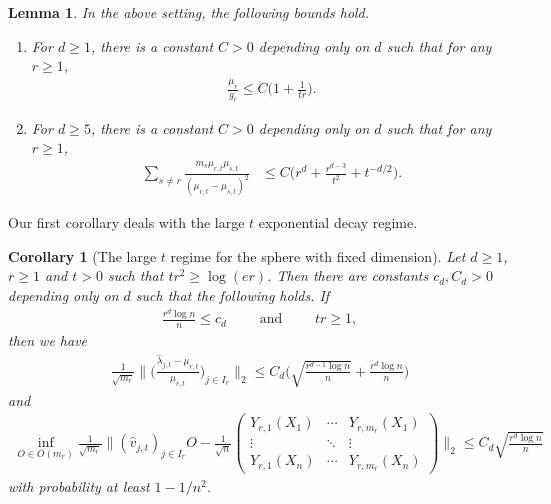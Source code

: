 \documentclass[a4paper,11pt]{article} %
\numberwithin{equation}{section}
\theoremstyle{definition}
\theoremstyle{remark}
\theoremstyle{plain}
\newtheorem{lemma}[definition]{Lemma}
\newtheorem{corollary}[definition]{Corollary}
\begin{document}
\begin{lemma}%
  \label{lem_EVExpressBound}
  In the above setting, the following bounds hold.
  \begin{enumerate}[label=(\roman*)]
    \item  For \( d \ge 1 \), there is a constant $C>0$ depending only on $d$ such that for any \( r \ge 1 \),
      \begin{align}
         \frac{\mu_{r}}{g_r} \le C \Big( 1 + \frac{1}{tr} \Big).
      \end{align}
    \item 
      For \( d \ge 5 \), there is a constant $C>0$ depending only on $d$ such that  for any \( r \ge 1 \),
      \begin{align}
        \sum_{s\neq r}\frac{m_s\mu_{r,t}\mu_{s,t}}{(\mu_{r,t}-\mu_{s,t})^2} & \le C\Big( r^{d} + \frac{r^{d-3}}{t^2} + t^{-d/2} \Big).
      \end{align}
  \end{enumerate}
\end{lemma}%

Our first corollary deals with the large \( t \) exponential decay regime. 




\begin{corollary}[The large $t$ regime for the sphere with fixed dimension]%
  \label{cor_SDLargeTFixedD}
  Let \( d \ge 1 \), $r \ge 1$ and $t > 0$ such that $t r^2 \ge \log(er)$. Then there are constants $c_d,C_d >0$ depending only on $d$ such that the following holds. If
  \begin{align}
    \frac{r^{d} \log n}{n} \le c_d
    \qquad \text{ and } \qquad 
    t r \ge 1,
  \end{align}
  then we have
  \begin{align}
        \frac{1}{\sqrt{m_r}} 
        \Big\|\Big( \frac {\widehat{\lambda}_{j, t}-\mu_{r, t}}{\mu_{r, t}}  \Big)_{j \in I_{r}} 
          \Big\|_{2}
    \le 
        C_{d}  \Big( \sqrt{ \frac{r^{d-1} \log n}{n} } + \frac{r^{d} \log n}{n} \Big)
  \end{align}
   and 
  \begin{align}
    \inf_{O \in O(m_r)} 
    \frac{1}{\sqrt{m_r}}\Bigg\| (\widehat v_{j,t})_{j \in I_r}O - \frac{1}{\sqrt{n}}  \begin{pmatrix}
                                                           Y_{r,1}(X_1) &\cdots &  Y_{r,m_r}(X_1)\\
                                                           \vdots  & \ddots & \vdots    \\
                                                           Y_{r,1}(X_n) &\cdots & Y_{r,m_r}(X_n) 
                                                         \end{pmatrix}
    \Bigg\|_2
    \le 
     C_{d}  \sqrt{ \frac{r^{d} \log n}{n} } 
  \end{align}
  with probability at least \( 1 - 1/n^2\).
\end{corollary}%
\end{document}
